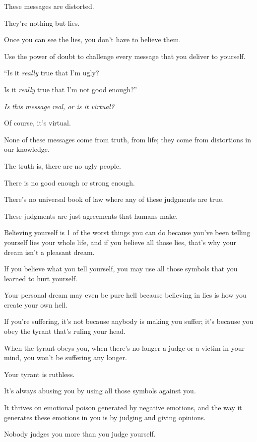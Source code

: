 \documentclass{article}
\numberwithin{equation}{section}
\begin{document}
These messages are distorted.

They're nothing but lies.

Once you can see the lies, you don't have to believe them.

Use the power of doubt to challenge every message that you deliver to yourself.

``Is it \textit{really} true that I'm ugly?

Is it \textit{really} true that I'm not good enough?''

\textit{Is this message real, or is it virtual?}

Of course, it's virtual.

None of these messages come from truth, from life; they come from distortions in our knowledge.

The truth is, there are no ugly people.

There is no good enough or strong enough.

There's no universal book of law where any of these judgments are true.

These judgments are just agreements that humans make.

%

Believing yourself is 1 of the worst things you can do because you've been telling yourself lies your whole life, and if you believe all those lies, that's why your dream isn't a pleasant dream.

If you believe what you tell yourself, you may use all those symbols that you learned to hurt yourself.

Your personal dream may even be pure hell because believing in lies is how you create your own hell.

If you're suffering, it's not because anybody is making you suffer; it's because you obey the tyrant that's ruling your head.

When the tyrant obeys you, when there's no longer a judge or a victim in your mind, you won't be suffering any longer.

%
Your tyrant is ruthless.

It's always abusing you by using all those symbols against you.

It thrives on emotional poison generated by negative emotions, and the way it generates these emotions in you is by judging and giving opinions.

Nobody judges you more than you judge yourself.
\end{document}
